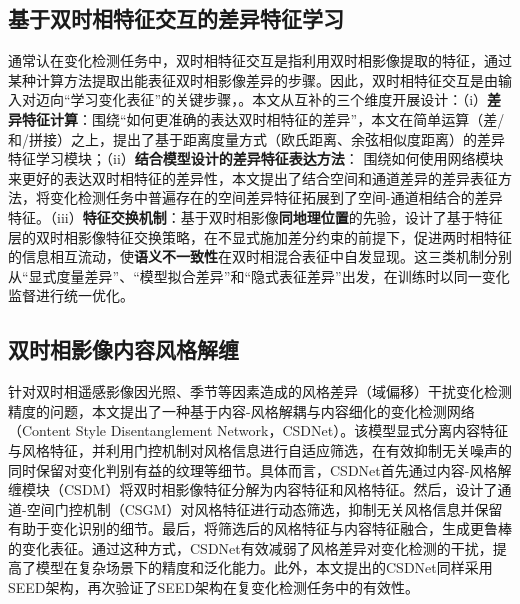 \subsection{基于双时相特征交互的差异特征学习}
通常认在变化检测任务中，双时相特征交互是指利用双时相影像提取的特征，通过某种计算方法提取出能表征双时相影像差异的步骤。因此，双时相特征交互是由输入对迈向“学习变化表征”的关键步骤，。本文从互补的三个维度开展设计：（i）\textbf{差异特征计算}：围绕“如何更准确的表达双时相特征的差异”，本文在简单运算（差/和/拼接）之上，提出了基于距离度量方式（欧氏距离、余弦相似度距离）的差异特征学习模块；（ii）\textbf{结合模型设计的差异特征表达方法}： 围绕如何使用网络模块来更好的表达双时相特征的差异性，本文提出了结合空间和通道差异的差异表征方法，将变化检测任务中普遍存在的空间差异特征拓展到了空间-通道相结合的差异特征。（iii）\textbf{特征交换机制}：基于双时相影像\textbf{同地理位置}的先验，设计了基于特征层的双时相影像特征交换策略，在不显式施加差分约束的前提下，促进两时相特征的信息相互流动，使\textbf{语义不一致性}在双时相混合表征中自发显现。这三类机制分别从“显式度量差异”、“模型拟合差异”和“隐式表征差异”出发，在训练时以同一变化监督进行统一优化。

\subsection{双时相影像内容风格解缠}

针对双时相遥感影像因光照、季节等因素造成的风格差异（域偏移）干扰变化检测精度的问题，本文提出了一种基于内容-风格解耦与内容细化的变化检测网络（Content Style Disentanglement Network，CSDNet）。该模型显式分离内容特征与风格特征，并利用门控机制对风格信息进行自适应筛选，在有效抑制无关噪声的同时保留对变化判别有益的纹理等细节。具体而言，CSDNet首先通过内容-风格解缠模块（CSDM）将双时相影像特征分解为内容特征和风格特征。然后，设计了通道-空间门控机制（CSGM）对风格特征进行动态筛选，抑制无关风格信息并保留有助于变化识别的细节。最后，将筛选后的风格特征与内容特征融合，生成更鲁棒的变化表征。通过这种方式，CSDNet有效减弱了风格差异对变化检测的干扰，提高了模型在复杂场景下的精度和泛化能力。此外，本文提出的CSDNet同样采用SEED架构，再次验证了SEED架构在复变化检测任务中的有效性。

